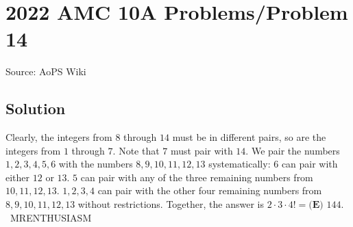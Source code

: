 \documentclass[12pt]{article}
\begin{document}
\section*{{2022 AMC 10A Problems/Problem 14}}
Source: AoPS Wiki

\subsection*{Solution}
Clearly, the integers from $8$ through $14$ must be in different pairs, so are the integers from $1$ through $7.$ Note that $7$ must pair with $14.$ We pair the numbers $1,2,3,4,5,6$ with the numbers $8,9,10,11,12,13$ systematically: $6$ can pair with either $12$ or $13.$ $5$ can pair with any of the three remaining numbers from $10,11,12,13.$ $1,2,3,4$ can pair with the other four remaining numbers from $8,9,10,11,12,13$ without restrictions. Together, the answer is $2\cdot3\cdot4!=\boxed{\textbf{(E) } 144}.$ ~MRENTHUSIASM
\end{document}
